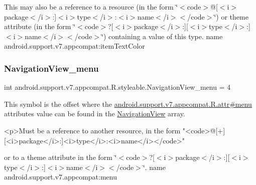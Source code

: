 This may also be a reference to a resource (in the form \char`\"{}$<$code$>$@\mbox{[}$<$i$>$package$<$/i$>$\+:\mbox{]}$<$i$>$type$<$/i$>$\+:$<$i$>$name$<$/i$>$$<$/code$>$\char`\"{}) or theme attribute (in the form \char`\"{}$<$code$>$?\mbox{[}$<$i$>$package$<$/i$>$\+:\mbox{]}\mbox{[}$<$i$>$type$<$/i$>$\+:\mbox{]}$<$i$>$name$<$/i$>$$<$/code$>$\char`\"{}) containing a value of this type.  name android.\+support.\+v7.\+appcompat\+:item\+Text\+Color \mbox{\label{classandroid_1_1support_1_1v7_1_1appcompat_1_1R_1_1styleable_a84980c41303c37f3fe37afc6d389b2cf}} 
\subsubsection{\texorpdfstring{Navigation\+View\+\_\+menu}{NavigationView\_menu}}
{\footnotesize\ttfamily int android.\+support.\+v7.\+appcompat.\+R.\+styleable.\+Navigation\+View\+\_\+menu = 4\hspace{0.3cm}{\ttfamily [static]}}

This symbol is the offset where the \hyperlink{classandroid_1_1support_1_1v7_1_1appcompat_1_1R_1_1attr_ad3871796a0d29974680c8d438612fa54}{android.\+support.\+v7.\+appcompat.\+R.\+attr\#menu} attribute\textquotesingle{}s value can be found in the \hyperlink{classandroid_1_1support_1_1v7_1_1appcompat_1_1R_1_1styleable_a52cfb3ba7bdfc8fb2cca459f35c24456}{Navigation\+View} array.

\begin{DoxyVerb}      <p>Must be a reference to another resource, in the form "<code>@[+][<i>package</i>:]<i>type</i>:<i>name</i></code>"
\end{DoxyVerb}
 or to a theme attribute in the form \char`\"{}$<$code$>$?\mbox{[}$<$i$>$package$<$/i$>$\+:\mbox{]}\mbox{[}$<$i$>$type$<$/i$>$\+:\mbox{]}$<$i$>$name$<$/i$>$$<$/code$>$\char`\"{}.  name android.\+support.\+v7.\+appcompat\+:menu \mbox{\label{classandroid_1_1support_1_1v7_1_1appcompat_1_1R_1_1styleable_abfcd5394a28e12e51efa5ac509687b26}} 
